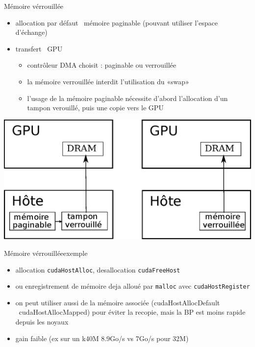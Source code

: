 \documentclass[11pt,mathserif]{beamer}
\newcommand{\gezi}{\faLongArrowRight}
\newcommand{\argi}{\faLightbulbO}
\newcommand{\triste}{\faFrownO}
\newcommand{\geziBikoitz}{\faArrowsH}
\begin{document}
\begin{frame}{Mémoire vérrouillée}
  \begin{itemize}[<+->]
    \item[\argi] allocation par défaut \gezi\ mémoire paginable (pouvant utiliser l'espace d'échange)
    \item[\argi] transfert \geziBikoitz\  GPU
      \begin{itemize}
        \item contrôleur DMA choisit : paginable ou verrouillée
        \item la mémoire verrouillée interdit l'utilisation du «swap»
        \item l'usage de la mémoire paginable nécessite d'abord l'allocation d'un tampon verouillé, puis une copie vers le GPU
      \end{itemize}
  \end{itemize}
\pause
  \begin{center}
  \includegraphics[width=0.6\linewidth]{fig/pinned_memory.eps}
  \end{center}
\end{frame}
\begin{frame}{Mémoire vérrouillée}{exemple}
  \begin{itemize}[<+->]
    \item[\argi] allocation {\tt cudaHostAlloc}, desallocation {\tt cudaFreeHost}
    \item[\argi] ou enregistrement de mémoire deja alloué par {\tt malloc} avec {\tt cudaHostRegister}
  
\item[\argi] on peut utiliser aussi de la mémoire associée (cudaHostAllocDefault \gezi\ cudaHostAllocMapped) pour éviter la recopie, mais la BP est moins rapide depuis les noyaux
\item[\triste] gain faible (ex sur un k40M 8.9Go/s vs 7Go/s pour 32M)
  \end{itemize}
\end{frame}
\end{document}
